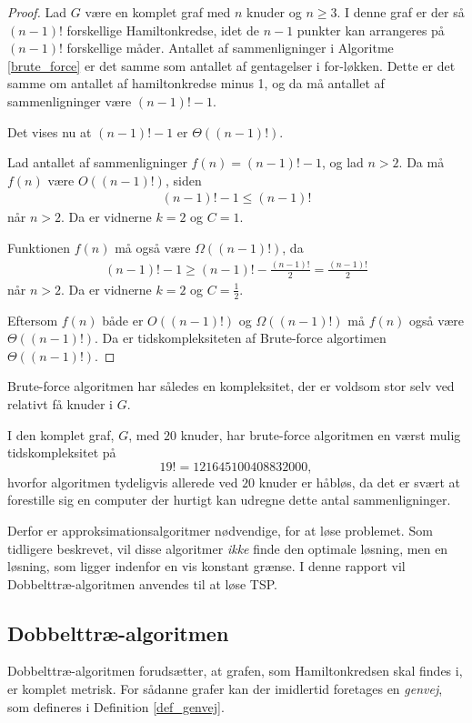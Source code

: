 \begin{proof}
	Lad $G$ være en komplet graf med $n$ knuder og $n \geq 3$.
	I denne graf er der så $(n-1)!$ forskellige Hamiltonkredse, idet de $n-1$ punkter kan arrangeres på $(n-1)!$ forskellige måder.
	Antallet af sammenligninger i Algoritme \ref{brute_force} er det samme som antallet af gentagelser i for-løkken.
	Dette er det samme om antallet af hamiltonkredse minus 1, og da må antallet af sammenligninger være $(n-1)! -1$.  	

	Det vises nu at $(n-1)! -1$ er $\Theta((n-1)!)$.

	Lad antallet af sammenligninger $f(n) = (n-1)! -1$, og lad $n > 2$.
	Da må $f(n)$ være $O((n-1)!)$, siden
	\begin{align*}
		(n-1)! -1 \leq (n-1)!
	\end{align*}
	når $n>2$. Da er vidnerne $k=2$ og $C=1$.
	
	Funktionen $f(n)$ må også være $\Omega((n-1)!)$, da
	\begin{align*}
		(n-1)! -1 \geq (n-1)! - \frac{(n-1)!}{2} = \frac{(n-1)!}{2}
	\end{align*}
	når $n>2$. Da er vidnerne $k=2$ og $C=\frac{1}{2}$.

	Eftersom $f(n)$ både er $O((n-1)!)$ og $\Omega((n-1)!)$ må $f(n)$ også være $\Theta((n-1)!)$. Da er tidskompleksiteten af Brute-force algortimen $\Theta((n-1)!)$.
\end{proof}

Brute-force algoritmen har således en kompleksitet, der er voldsom stor selv ved relativt få knuder i $G$.

\begin{exmp}
I den komplet graf, $G$, med $20$ knuder, har brute-force algoritmen en værst mulig tidskompleksitet på $$19! = 121645100408832000,$$ hvorfor algoritmen tydeligvis allerede ved $20$ knuder er håbløs, da det er svært at forestille sig en computer der hurtigt kan udregne dette antal sammenligninger.
\end{exmp}

Derfor er approksimationsalgoritmer nødvendige, for at løse problemet. Som tidligere beskrevet, vil disse algoritmer \textit{ikke} finde den optimale løsning, men en løsning, som ligger indenfor en vis konstant grænse. I denne rapport vil Dobbelttræ-algoritmen anvendes til at løse TSP. 

\subsection{Dobbelttræ-algoritmen}
Dobbelttræ-algoritmen forudsætter, at grafen, som Hamiltonkredsen skal findes i, er komplet metrisk. For sådanne grafer kan der imidlertid foretages en \textit{genvej}, som defineres i Definition \ref{def_genvej}.

